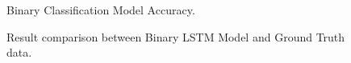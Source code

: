 \begin{figure}
\begin{center}
\end{center}
\decoRule
\caption[Binary Classification Model Accuracy]{Binary Classification Model Accuracy.}
\label{fig:binary-lstm-acc}
\end{figure}

\begin{figure}
\begin{center}
\end{center}
\decoRule
\caption[Result comparison between Binary LSTM Model and Ground Truth data]{Result comparison between Binary LSTM Model and Ground Truth data.}
\label{fig:binary-lstm-results}
\end{figure}


